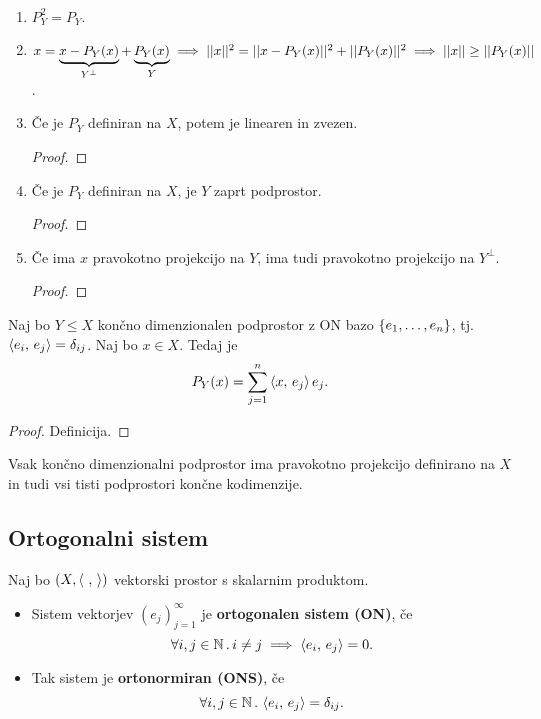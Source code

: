 \begin{opomba}
    \ 
    \begin{enumerate}
        \item \(P_Y^2 = P_Y\).
        \item \(x = \underbrace{x - P_Y(x)}_{Y^\perp} + \underbrace{P_Y(x)}_Y \implies ||x||^2 = ||x - P_Y(x)||^2 + ||P_Y(x)||^2 \implies ||x|| \geq ||P_Y(x)||\).
        \item Če je \(P_Y\) definiran na \(X\), potem je linearen in zvezen.
        \begin{proof}
            \todo{}
        \end{proof}
        \item Če je \(P_Y\) definiran na \(X\), je \(Y\) zaprt podprostor.
        \begin{proof}
            \todo{}
        \end{proof}
        \item Če ima \(x\) pravokotno projekcijo na \(Y\), ima tudi pravokotno projekcijo na \(Y^\perp\).
        \begin{proof}
            \todo{}
        \end{proof}
    \end{enumerate}
\end{opomba}

\begin{trditev}
    Naj bo \(Y \leq X\) končno dimenzionalen podprostor z ON bazo \(\left\{e_1, \ldots, e_n\right\}\), tj. \(\left\langle e_i, \, e_j \right\rangle = \delta_{ij}\). Naj bo \(x \in X\). Tedaj je \[P_Y(x) = \sum_{j=1}^{n} \left\langle x, \, e_j \right\rangle e_j.\]
\end{trditev}

\begin{proof}
    Definicija.
\end{proof}

\begin{opomba}
    Vsak končno dimenzionalni podprostor ima pravokotno projekcijo definirano na \(X\) in tudi vsi tisti podprostori končne kodimenzije.
\end{opomba}

\subsection{Ortogonalni sistem}
\begin{definicija}
    Naj bo \((X, \left\langle \ , \,  \right\rangle)\) vektorski prostor s skalarnim produktom. 
    \begin{itemize}
        \item Sistem vektorjev \((e_j)_{j=1}^\infty\) je \textbf{ortogonalen sistem (ON)}, če \[\forall i,j \in \mathbb{N} \,.\, i \neq j \implies \left\langle e_i, \, e_j \right\rangle = 0.\]
        \item Tak sistem je \textbf{ortonormiran (ONS)}, če \[\forall i,j \in \mathbb{N} \,.\, \left\langle e_i, \, e_j \right\rangle = \delta_{ij}.\]
    \end{itemize}   
\end{definicija}

